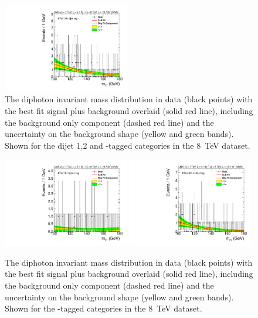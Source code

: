\begin{figure}
  \includegraphics[width=0.49\textwidth]{results/plots/mgg-cats/mgg_mva_nosub_ch2_cat13_8TeV.pdf}
  \caption[The diphoton invariant mass distribution in data with the best fit signal plus background overlaid for the dijet 1,2 and \acs{VH}-tagged categories in the 8~TeV dataset]{The diphoton invariant mass distribution in data (black points) with the best fit signal plus background overlaid (solid red line), including the background only component (dashed red line) and the uncertainty on the background shape (yellow and green bands). Shown for the dijet 1,2 and \VH-tagged categories in the 8~TeV dataset.}
  \label{fig:bfres4}
\end{figure}

\begin{figure}
  \vspace{-1cm}
  \includegraphics[width=0.49\textwidth]{results/plots/mgg-cats/mgg_mva_nosub_ch2_cat11_8TeV.pdf}
  \includegraphics[width=0.49\textwidth]{results/plots/mgg-cats/mgg_mva_nosub_ch2_cat12_8TeV.pdf}
  \caption[The diphoton invariant mass distribution in data with the best fit signal plus background overlaid for the \acs{ttH}-tagged categories in the 8~TeV dataset]{The diphoton invariant mass distribution in data (black points) with the best fit signal plus background overlaid (solid red line), including the background only component (dashed red line) and the uncertainty on the background shape (yellow and green bands). Shown for the \ttH-tagged categories in the 8~TeV dataset.}
  \label{fig:bfres5}
\end{figure}

